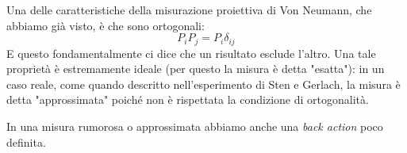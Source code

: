 \vspace{0.5cm}

\noindent  {}
\vspace{0.5cm}
\noindent Una delle caratteristiche della misurazione proiettiva di Von Neumann, che abbiamo già visto, è che sono ortogonali:
\begin{equation*}
    P_i P_j = P_i \delta _{ij}
\end{equation*}
E questo fondamentalmente ci dice che un risultato esclude l'altro. Una tale proprietà è estremamente ideale (per questo la misura è detta "esatta"): in un caso reale, come quando descritto nell'esperimento di Sten e Gerlach, la misura è detta "approssimata" poiché non è rispettata la condizione di ortogonalità.

\noindent In una misura rumorosa o approssimata abbiamo anche una \textit{back action} poco definita. 

